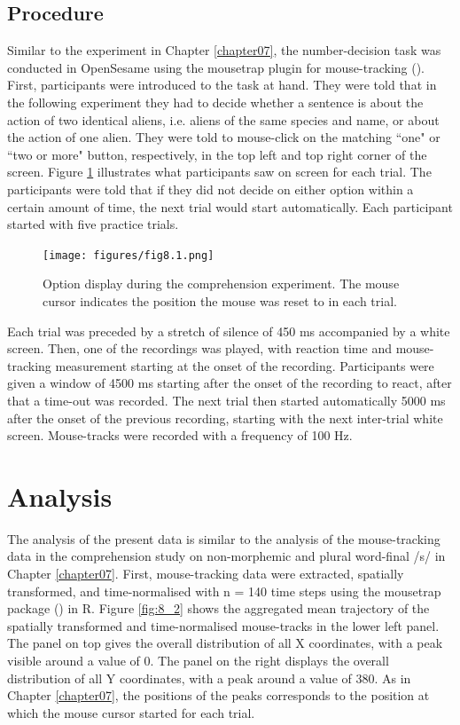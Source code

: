 \subsection{Procedure}\label{section08_1_3}

Similar to the experiment in Chapter \ref{chapter07}, the number-decision task was conducted in OpenSesame using the mousetrap plugin for mouse-tracking (\cite{Kieslich2017}). First, participants were introduced to the task at hand. They were told that in the following experiment they had to decide whether a sentence is about the action of two identical aliens, i.e. aliens of the same species and name, or about the action of one alien. They were told to mouse-click on the matching ``one" or ``two or more" button, respectively, in the top left and top right corner of the screen. Figure \ref{fig:8_1} illustrates what participants saw on screen for each trial. The participants were told that if they did not decide on either option within a certain amount of time, the next trial would start automatically. Each participant started with five practice trials.

\begin{figure}
    \centering
    \texttt{[image: figures/fig8.1.png]}
    \caption{Option display during the comprehension experiment. The mouse cursor indicates the position the mouse was reset to in each trial.}
    \label{fig:8_1}
\end{figure}

Each trial was preceded by a stretch of silence of 450 ms accompanied by a white screen. Then, one of the recordings was played, with reaction time and mouse-tracking measurement starting at the onset of the recording. Participants were given a window of 4500 ms starting after the onset of the recording to react, after that a time-out was recorded. The next trial then started automatically 5000 ms after the onset of the previous recording, starting with the next inter-trial white screen. Mouse-tracks were recorded with a frequency of 100 Hz.

\section{Analysis}\label{section08_2}

The analysis of the present data is similar to the analysis of the mouse-tracking data in the comprehension study on non-morphemic and plural word-final /s/ in Chapter \ref{chapter07}. First, mouse-tracking data were extracted, spatially transformed, and time-normalised with n = 140 time steps using the mousetrap package (\cite{Kieslich2019}) in R. Figure \ref{fig:8_2} shows the aggregated mean trajectory of the spatially transformed and time-normalised mouse-tracks in the lower left panel. The panel on top gives the overall distribution of all X coordinates, with a peak visible around a value of $0$. The panel on the right displays the overall distribution of all Y coordinates, with a peak around a value of $380$. As in Chapter \ref{chapter07}, the positions of the peaks corresponds to the position at which the mouse cursor started for each trial.

